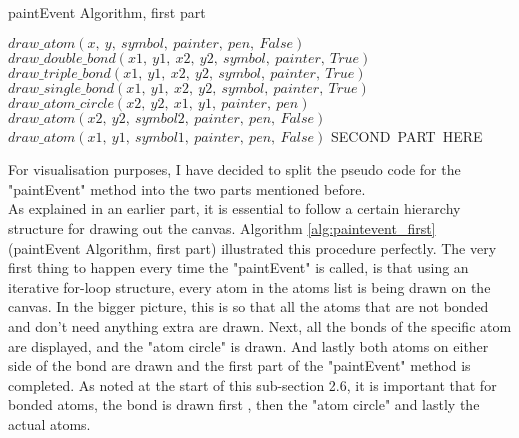 \documentclass[a4paper,12pt]{article}
\begin{document}
\begin{algorithm}
\footnotesize
\caption{paintEvent Algorithm, first part}\label{alg:paintevent_first}
\begin{algorithmic}
	\State $ draw\_atom(x,\ y,\ symbol,\ painter,\ pen,\ False)$
			\State $ draw\_double\_bond(x1,\ y1,\ x2,\ y2,\ symbol,\ painter,\ True)$
			\State $ draw\_triple\_bond(x1,\ y1,\ x2,\ y2,\ symbol,\ painter,\ True)$
		\Else
			\State $ draw\_single\_bond(x1,\ y1,\ x2,\ y2,\ symbol,\ painter,\ True)$
		\EndIf
		\State $ draw\_atom\_circle(x2,\ y2,\ x1,\ y1,\ painter,\ pen)$
		\State $ draw\_atom(x2,\ y2,\ symbol2,\ painter,\ pen,\ False)$
		\State $ draw\_atom(x1,\ y1,\ symbol1,\ painter,\ pen,\ False)$
	\EndFor
\EndFor
\State SECOND\ PART\ HERE
\EndFunction
\end{algorithmic}
\end{algorithm}

For visualisation purposes, I have decided to split the pseudo code for the "paintEvent" method into the two parts mentioned before.\\
As explained in an earlier part, it is essential to follow a certain hierarchy structure for drawing out the canvas. Algorithm \ref{alg:paintevent_first} (paintEvent Algorithm, first part) illustrated this procedure perfectly. The very first thing to happen every time the "paintEvent" is called, is that using an iterative for-loop structure, every atom in the atoms list is being drawn on the canvas. In the bigger picture, this is so that all the atoms that are not bonded and don't need anything extra are drawn. Next, all the bonds of the specific atom are displayed, and the "atom circle" is drawn. And lastly both atoms on either side of the bond are drawn and the first part of the "paintEvent" method is completed. As noted at the start of this sub-section 2.6, it is important that for bonded atoms, the bond is drawn first , then the "atom circle" and lastly the actual atoms.

\newpage
\end{document}
